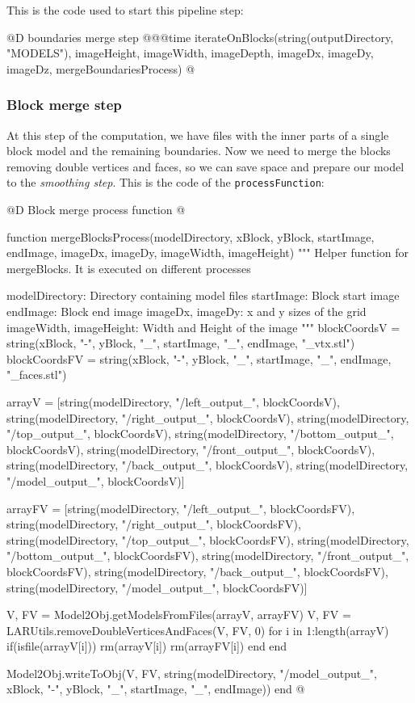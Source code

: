\documentclass[11pt,oneside]{article}	%
\begin{document}
This is the code used to start this pipeline step:

@D boundaries merge step
@{@@time iterateOnBlocks(string(outputDirectory, "MODELS"),
                  imageHeight, imageWidth, imageDepth,
                  imageDx, imageDy, imageDz,
                  mergeBoundariesProcess) @}
                
\subsubsection{Block merge step}\label{sec:blockMergeStep}

At this step of the computation, we have files with the inner parts of a single block model and the remaining boundaries. Now we need to merge the blocks removing double vertices and faces, so we can save space and prepare our model to the \textit{smoothing step}. This is the code of the \texttt{processFunction}:

@D Block merge process function
@{function mergeBlocksProcess(modelDirectory,
			      xBlock, yBlock,
			      startImage, endImage,
			      imageDx, imageDy,
			      imageWidth, imageHeight)
  """
  Helper function for mergeBlocks.
  It is executed on different processes

  modelDirectory: Directory containing model files
  startImage: Block start image
  endImage: Block end image
  imageDx, imageDy: x and y sizes of the grid
  imageWidth, imageHeight: Width and Height of the image
  """
  blockCoordsV = string(xBlock, "-", yBlock, "_", startImage,
			"_", endImage, "_vtx.stl")
  blockCoordsFV = string(xBlock, "-", yBlock, "_", startImage,
			"_", endImage, "_faces.stl")

  arrayV = [string(modelDirectory, "/left_output_", blockCoordsV),
	    string(modelDirectory, "/right_output_", blockCoordsV),
	    string(modelDirectory, "/top_output_", blockCoordsV),
	    string(modelDirectory, "/bottom_output_", blockCoordsV),
	    string(modelDirectory, "/front_output_", blockCoordsV),
	    string(modelDirectory, "/back_output_", blockCoordsV),
	    string(modelDirectory, "/model_output_", blockCoordsV)]

  arrayFV = [string(modelDirectory, "/left_output_", blockCoordsFV),
	      string(modelDirectory, "/right_output_", blockCoordsFV),
	      string(modelDirectory, "/top_output_", blockCoordsFV),
	      string(modelDirectory, "/bottom_output_", blockCoordsFV),
	      string(modelDirectory, "/front_output_", blockCoordsFV),
	      string(modelDirectory, "/back_output_", blockCoordsFV),
	      string(modelDirectory, "/model_output_", blockCoordsFV)]

  V, FV = Model2Obj.getModelsFromFiles(arrayV, arrayFV)
  V, FV = LARUtils.removeDoubleVerticesAndFaces(V, FV, 0)
  for i in 1:length(arrayV)
    if(isfile(arrayV[i]))
      rm(arrayV[i])
      rm(arrayFV[i])
    end
  end

  Model2Obj.writeToObj(V, FV, string(modelDirectory, "/model_output_",
			    xBlock, "-", yBlock, "_", startImage, "_", endImage))
end @}
\end{document}
